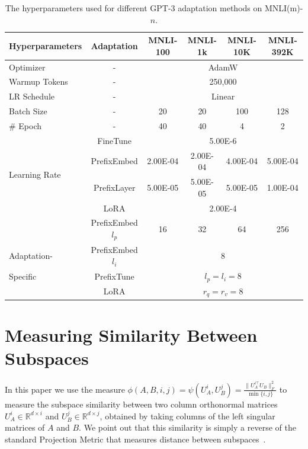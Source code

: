 \documentclass{article} %
\begin{document}
\begin{table}[h]
\centering
\begin{tabular}{l|c|cccc}
\hline
\toprule
Hyperparameters & Adaptation & MNLI-100 & MNLI-1k & MNLI-10K & MNLI-392K \\
\midrule
Optimizer & - & \multicolumn{4}{c}{AdamW} \\
Warmup Tokens & - & \multicolumn{4}{c}{250,000} \\
LR Schedule & - & \multicolumn{4}{c}{Linear} \\
Batch Size & - & 20 & 20 & 100 & 128 \\
\# Epoch & - & 40 & 40 & 4 & 2 \\
\midrule
\multirow{4}{*}{Learning Rate} & FineTune & \multicolumn{4}{c}{5.00E-6} \\
                               & PrefixEmbed & 2.00E-04 & 2.00E-04 & 4.00E-04 & 5.00E-04 \\
                               & PrefixLayer & 5.00E-05 & 5.00E-05 & 5.00E-05 & 1.00E-04 \\
                               & LoRA & \multicolumn{4}{c}{2.00E-4} \\
\midrule
                            & PrefixEmbed $l_p$ & 16 & 32 & 64 & 256 \\
 Adaptation-                & PrefixEmbed $l_i$ & \multicolumn{4}{c}{8} \\
 Specific                   & PrefixTune & \multicolumn{4}{c}{$l_p=l_i=8$} \\
                            & LoRA & \multicolumn{4}{c}{$r_q=r_v=8$} \\
\bottomrule
\end{tabular}
\caption{The hyperparameters used for different GPT-3 adaptation methods on MNLI(m)-$n$.}
\label{tab:hyper_gpt3_low}
\end{table}


\section{Measuring Similarity Between Subspaces}
\label{app:grassmann_distance}

In this paper we use the measure $\phi(A, B, i, j) = \psi(U_A^i, U_B^j) = \frac{\| U_A^{i\top } U_B \|_F^2}{\min \{i, j\}}$ to measure the subspace similarity between two column orthonormal matrices $U_A^i \in \mathbb{R}^{d \times i}$ and $U_B^j \in \mathbb{R}^{d \times j}$, obtained by taking columns of the left singular matrices of $A$ and $B$.
We point out that this similarity is simply a reverse of the standard Projection Metric that measures distance between subspaces~\cite{dist}.
\end{document}
